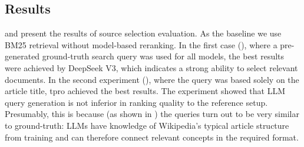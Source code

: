 \documentclass{superfri}
\begin{document}
\subsection{Results}
 and  present the results of source selection evaluation.
As the baseline we use BM25 retrieval without model-based reranking.
In the first case (), where a pre-generated ground-truth search query was used for all models,
the best results were achieved by DeepSeek V3, which indicates a strong ability to select relevant documents.
In the second experiment (), where the query was based solely on the article title, tpro achieved the best results.
The experiment showed that LLM query generation is not inferior in ranking quality to the reference setup.
Presumably, this is because (as shown in ) the queries turn out to be very similar to ground-truth:
LLMs have knowledge of Wikipedia’s typical article structure from training and can therefore connect relevant concepts in the required format.

\end{document}
